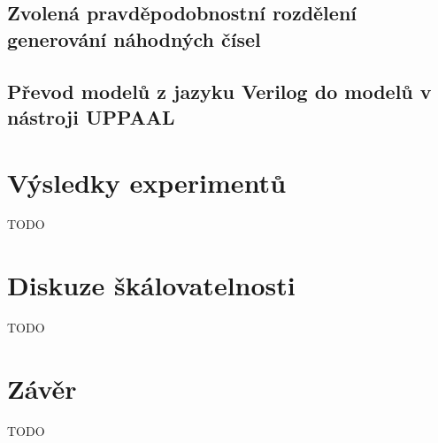 \section{Zvolená pravděpodobnostní rozdělení generování náhodných čísel} \label{rozdeleni_pst}

\section{Převod modelů z jazyku Verilog do modelů v nástroji UPPAAL} \label{parser}

\chapter{Výsledky experimentů}
\label{popis}
TODO

\chapter{Diskuze škálovatelnosti} 
\label{skalovatelnost}
TODO

\chapter{Závěr}
\label{zaver}
TODO


%

